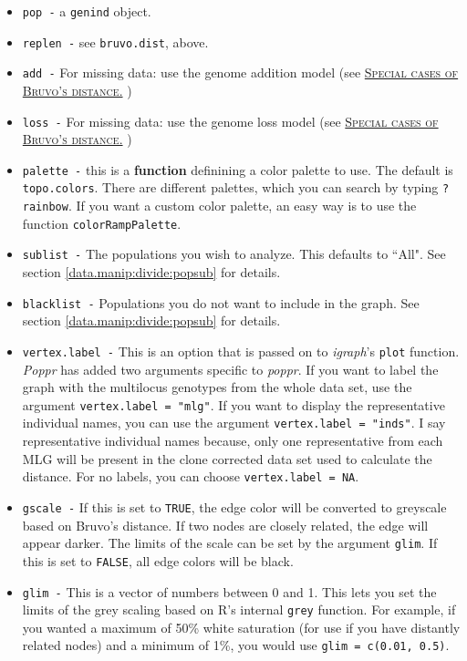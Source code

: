 \documentclass[letterpaper]{article}\usepackage[]{graphicx}\usepackage[]{color}
\newcommand{\seclink}[2]{
  \textsc{\hyperref[#1]{#2}}
}
\newcommand{\poppr}{\textit{poppr}}
\newcommand{\Poppr}{\textit{Poppr}}
\begin{document}
\begin{itemize}
  \item \texttt{pop -} a \texttt{genind} object.
  \item \texttt{replen -} see \texttt{bruvo.dist}, above.
  \item \texttt{add -} For missing data: use the genome addition model (see\seclink{appendix:algorithm:bruvospecial}{Special cases of Bruvo's distance.})
  \item \texttt{loss -} For missing data: use the genome loss model (see\seclink{appendix:algorithm:bruvospecial}{Special cases of Bruvo's distance.})
  \item \texttt{palette -} this is a \textbf{function} definining a color palette to use. The default is \texttt{topo.colors}. There are different palettes, which you can search by typing \texttt{?rainbow}. If you want a custom color palette, an easy way is to use the function \texttt{colorRampPalette}.
  \item \texttt{sublist -} The populations you wish to analyze. This defaults to ``All". See section \ref{data.manip:divide:popsub} for details.
  \item \texttt{blacklist -} Populations you do not want to include in the graph. See section \ref{data.manip:divide:popsub} for details.
  \item \texttt{vertex.label -} This is an option that is passed on to \textit{igraph}'s \texttt{plot} function. \Poppr{} has added two arguments specific to \poppr{}. If you want to label the graph with the multilocus genotypes from the whole data set, use the argument \texttt{vertex.label = "mlg"}. If you want to display the representative individual names, you can use the argument \texttt{vertex.label = "inds"}. I say representative individual names because, only one representative from each MLG will be present in the clone corrected data set used to calculate the distance. For no labels, you can choose \texttt{vertex.label = NA}. 
  \item \texttt{gscale -} If this is set to \texttt{TRUE}, the edge color will be converted to greyscale based on Bruvo's distance. If two nodes are closely related, the edge will appear darker. The limits of the scale can be set by the argument \texttt{glim}. If this is set to \texttt{FALSE}, all edge colors will be black. 
  \item \texttt{glim -} This is a vector of numbers between 0 and 1. This lets you set the limits of the grey scaling based on R's internal \texttt{grey} function. For example, if you wanted a maximum of 50\% white saturation (for use if you have distantly related nodes) and a minimum of 1\%, you would use \texttt{glim = c(0.01, 0.5)}. 

\end{itemize}
\end{document}
